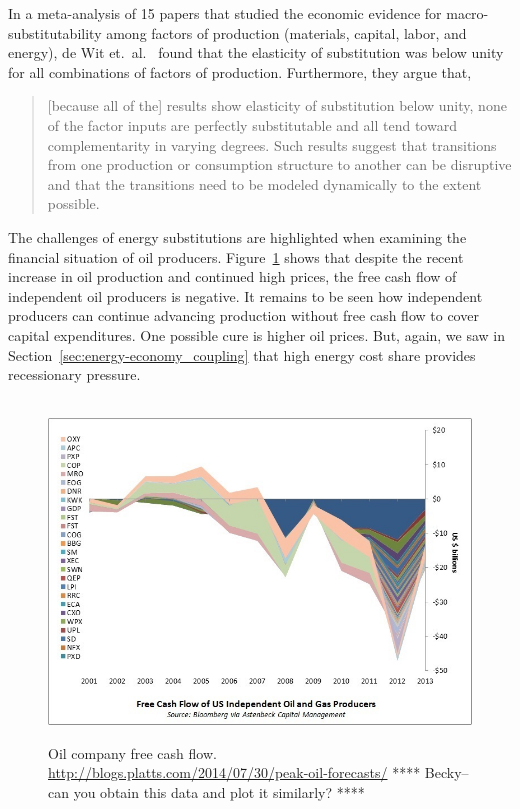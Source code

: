 In a meta-analysis of 15 papers that studied 
the economic evidence for macro-substitutability
among factors of production (materials, capital, labor, and energy), 
de Wit et.\ al.~\cite{de-Wit:2013aa} found that the elasticity of substitution was 
below unity for all combinations of factors of production.
Furthermore, they argue that, 
%
\begin{quote}
	[because all of the] results show elasticity of substitution below unity, 
	none of the factor inputs are perfectly substitutable and 
	all tend toward complementarity in varying degrees. 
	Such results suggest that transitions 
	from one production or consumption structure to another 
	can be disruptive and that the transitions 
	need to be modeled dynamically to the extent possible.\cite[p.~8]{de-Wit:2013aa}
\end{quote}

The challenges of energy substitutions are highlighted
when examining the financial situation of oil producers.
Figure~\ref{fig:oil_company_free_cash_flow} 
shows that despite the recent increase in oil production
and continued high prices, 
the free cash flow of independent oil producers is negative.
It remains to be seen how independent producers can continue advancing 
production without free cash flow to cover capital expenditures.
One possible cure is higher oil prices.
But, again, we saw 
in Section~\ref{sec:energy-economy_coupling}
that high energy cost share 
provides recessionary pressure.

\begin{figure}[!ht]
\centering\
\includegraphics[width=\linewidth]{Part_0/Chapter_Introduction/images/Cash-Flow.jpg}
\caption[Oil company free cash flow]{Oil company free cash flow.
\url{http://blogs.platts.com/2014/07/30/peak-oil-forecasts/}
**** Becky--can you obtain this data and plot it similarly? ****
}
\label{fig:oil_company_free_cash_flow}
\end{figure}

